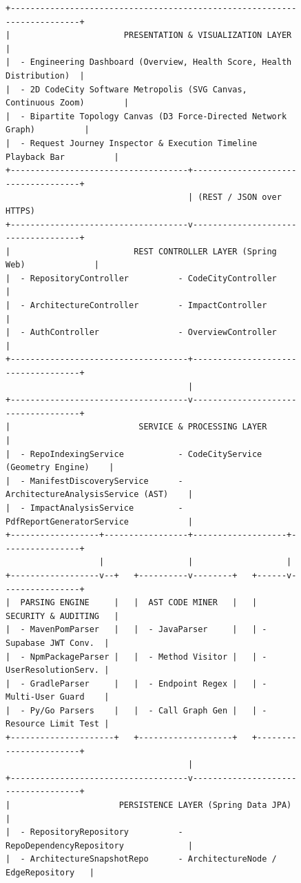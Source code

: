 \documentclass[11pt,a4paper,openany]{report}
\begin{document}
\begin{figure}[htbp]
\centering
\begin{lstlisting}[style=asciistyle, rulecolor=\color{primary}]
+-------------------------------------------------------------------------+
|                       PRESENTATION & VISUALIZATION LAYER                |
|  - Engineering Dashboard (Overview, Health Score, Health Distribution)  |
|  - 2D CodeCity Software Metropolis (SVG Canvas, Continuous Zoom)        |
|  - Bipartite Topology Canvas (D3 Force-Directed Network Graph)          |
|  - Request Journey Inspector & Execution Timeline Playback Bar          |
+------------------------------------+------------------------------------+
                                     | (REST / JSON over HTTPS)
+------------------------------------v------------------------------------+
|                         REST CONTROLLER LAYER (Spring Web)              |
|  - RepositoryController          - CodeCityController                   |
|  - ArchitectureController        - ImpactController                     |
|  - AuthController                - OverviewController                   |
+------------------------------------+------------------------------------+
                                     |
+------------------------------------v------------------------------------+
|                          SERVICE & PROCESSING LAYER                     |
|  - RepoIndexingService           - CodeCityService (Geometry Engine)    |
|  - ManifestDiscoveryService      - ArchitectureAnalysisService (AST)    |
|  - ImpactAnalysisService         - PdfReportGeneratorService            |
+------------------+-----------------+-------------------+----------------+
                   |                 |                   |
+------------------v--+   +----------v--------+   +------v----------------+
|  PARSING ENGINE     |   |  AST CODE MINER   |   | SECURITY & AUDITING   |
|  - MavenPomParser   |   |  - JavaParser     |   | - Supabase JWT Conv.  |
|  - NpmPackageParser |   |  - Method Visitor |   | - UserResolutionServ. |
|  - GradleParser     |   |  - Endpoint Regex |   | - Multi-User Guard    |
|  - Py/Go Parsers    |   |  - Call Graph Gen |   | - Resource Limit Test |
+---------------------+   +-------------------+   +-----------------------+
                                     |
+------------------------------------v------------------------------------+
|                      PERSISTENCE LAYER (Spring Data JPA)                |
|  - RepositoryRepository          - RepoDependencyRepository             |
|  - ArchitectureSnapshotRepo      - ArchitectureNode / EdgeRepository   |

\end{lstlisting}
\end{figure}
\end{document}
